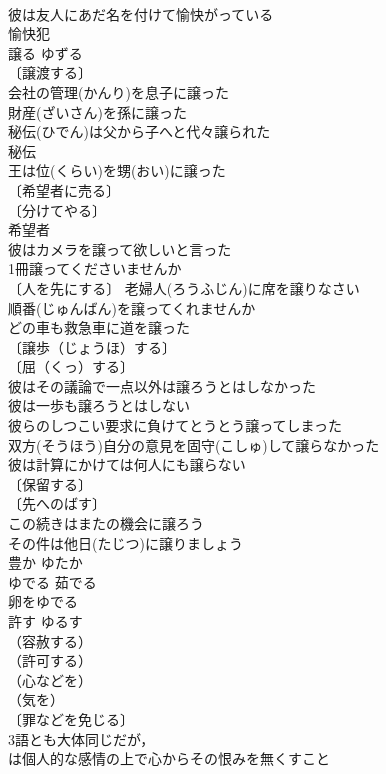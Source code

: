 \documentclass[8pt]{extreport}
\begin{document}
\begin{CJK}{UTF8}{min}
\\	彼は友人にあだ名を付けて愉快がっている 
\\	愉快犯 
\\	譲る	ゆずる	
\\	〔譲渡する〕
\\	会社の管理(かんり)を息子に譲った 
\\	財産(ざいさん)を孫に譲った 
\\	秘伝(ひでん)は父から子へと代々譲られた 
\\	秘伝　
\\	王は位(くらい)を甥(おい)に譲った 
\\	〔希望者に売る〕
\\	〔分けてやる〕
\\	希望者　
\\	彼はカメラを譲って欲しいと言った 
\\	1冊譲ってくださいませんか 
\\	〔人を先にする〕 老婦人(ろうふじん)に席を譲りなさい 
\\	順番(じゅんばん)を譲ってくれませんか 
\\	どの車も救急車に道を譲った 
\\	〔譲歩（じょうほ）する〕
\\	〔屈（くっ）する〕
\\	彼はその議論で一点以外は譲ろうとはしなかった 
\\	彼は一歩も譲ろうとはしない 
\\	彼らのしつこい要求に負けてとうとう譲ってしまった 
\\	双方(そうほう)自分の意見を固守(こしゅ)して譲らなかった 
\\	彼は計算にかけては何人にも譲らない 
\\	〔保留する〕
\\	〔先へのばす〕
\\	この続きはまたの機会に譲ろう 
\\	その件は他日(たじつ)に譲りましょう 
\\	豊か	ゆたか	
\\	ゆでる	茹でる	
\\	卵をゆでる 
\\	許す	ゆるす	
\\	（容赦する）
\\	（許可する）
\\	（心などを）
\\	（気を）
\\	〔罪などを免じる〕
\\	3語とも大体同じだが，
\\	は個人的な感情の上で心からその恨みを無くすこと

\end{CJK}
\end{document}
